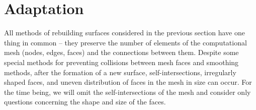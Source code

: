 \documentclass[
11pt,%
tightenlines,%
twoside,%
onecolumn,%
nofloats,%
nobibnotes,%
nofootinbib,%
superscriptaddress,%
noshowpacs,%
centertags]%
{revtex4}
\begin{document}

\section{Adaptation}

All methods of rebuilding surfaces considered in the previous section have one thing in common -- they preserve the number of elements of the computational mesh (nodes, edges, faces) and the connections between them.
Despite some special methods for preventing collisions between mesh faces and smoothing methods, after the formation of a new surface, self-intersections, irregularly shaped faces, and uneven distribution of faces in the mesh in size can occur.
For the time being, we will omit the self-intersections of the mesh and consider only questions concerning the shape and size of the faces.
\end{document}

